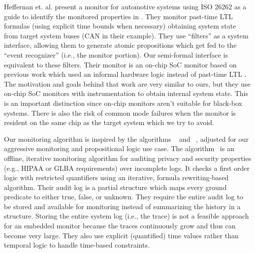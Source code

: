Heffernan et. al. present a monitor for automotive systems using ISO 26262 as a guide to identify the monitored properties in \cite{Heffernan2014}. They monitor past-time LTL formulas (using explicit time bounds when necessary) obtaining system state from target system buses (CAN in their example). They use ``filters'' as a system interface, allowing them to generate atomic propositions which get fed to the ``event recognizer'' (i.e., the monitor portion). Our semi-formal interface is equivalent to these filters. 
Their monitor is an on-chip SoC monitor based on previous work which used an informal hardware logic instead of past-time LTL \cite{Heffernan2009}.
%
The motivation and goals behind that work are very similar to ours, but they use on-chip SoC monitors with instrumentation to obtain internal system state. This is an important distinction since on-chip monitors aren't suitable for black-box systems. There is also the risk of common mode failures when the monitor is resident on the same chip as the target system which we try to avoid.

Our monitoring algorithm is inspired by the algorithms \greduce\ \cite{Garg2011} and \precis\ \cite{Chowdhury2014}, adjusted for our aggressive monitoring and propositional logic use case. 
%
The algorithm \greduce\ is an offline, iterative monitoring algorithm for auditing privacy and security properties (e.g., HIPAA \cite{HIPAA2002} or GLBA \cite{GLBA1999} requirements) over incomplete logs. It checks a first order logic with restricted quantifiers \cite{Garg2011} using an iterative, formula rewriting-based algorithm.
Their audit log is a partial structure which maps every ground predicate to either true, false, or unknown.
They require the entire audit log to be stored and available for monitoring instead of summarizing the history in a structure.
Storing the entire system log (i.e., the trace) is not a feasible approach for an embedded monitor because the traces continuously grow and thus can become very large.
%
They also use explicit (quantified) time values rather than temporal logic to handle time-based constraints. 

